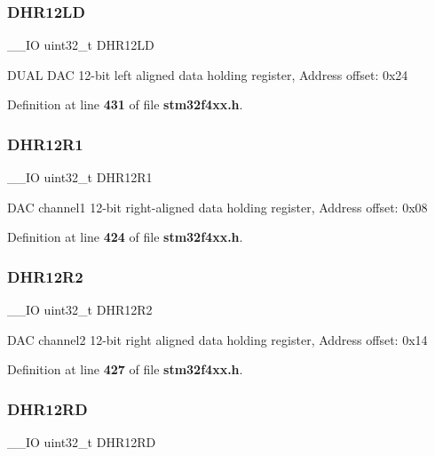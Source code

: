 \subsubsection{D\+H\+R12\+LD}
{\footnotesize\ttfamily \+\_\+\+\_\+\+IO uint32\+\_\+t D\+H\+R12\+LD}

D\+U\+AL D\+AC 12-\/bit left aligned data holding register, Address offset\+: 0x24 

Definition at line \textbf{ 431} of file \textbf{ stm32f4xx.\+h}.

\mbox{\label{structDAC__TypeDef_ac2bb55b037b800a25852736afdd7a258}} 
\subsubsection{D\+H\+R12\+R1}
{\footnotesize\ttfamily \+\_\+\+\_\+\+IO uint32\+\_\+t D\+H\+R12\+R1}

D\+AC channel1 12-\/bit right-\/aligned data holding register, Address offset\+: 0x08 

Definition at line \textbf{ 424} of file \textbf{ stm32f4xx.\+h}.

\mbox{\label{structDAC__TypeDef_a804c7e15dbb587c7ea25511f6a7809f7}} 
\subsubsection{D\+H\+R12\+R2}
{\footnotesize\ttfamily \+\_\+\+\_\+\+IO uint32\+\_\+t D\+H\+R12\+R2}

D\+AC channel2 12-\/bit right aligned data holding register, Address offset\+: 0x14 

Definition at line \textbf{ 427} of file \textbf{ stm32f4xx.\+h}.

\mbox{\label{structDAC__TypeDef_a1590b77e57f17e75193da259da72095e}} 
\subsubsection{D\+H\+R12\+RD}
{\footnotesize\ttfamily \+\_\+\+\_\+\+IO uint32\+\_\+t D\+H\+R12\+RD}

